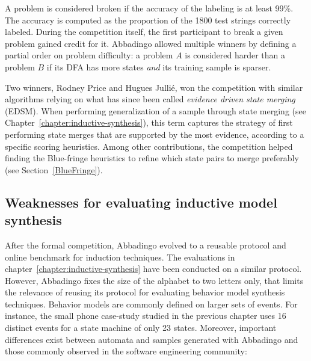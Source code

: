 A problem is considered broken if the accuracy of the labeling is at least 99\%. The accuracy is computed as the proportion of the 1800 test strings correctly labeled. During the competition itself, the first participant to break a given problem gained credit for it. Abbadingo allowed multiple winners by defining a partial order on problem difficulty: a problem $A$ is considered harder than a problem $B$ if its DFA has more states \emph{and} its training sample is sparser. 

Two winners, Rodney Price and Hugues Julli\'e, won the competition with similar algorithms relying on what has since been called \emph{evidence driven state merging} (EDSM). When performing generalization of a sample through state merging (see Chapter~\ref{chapter:inductive-synthesis}), this term captures the strategy of first performing state merges that are supported by the most evidence, according to a specific scoring heuristics. Among other contributions, the competition helped finding the Blue-fringe heuristics to refine which state pairs to merge preferably (see Section~\ref{BlueFringe}).

\subsection{Weaknesses for evaluating inductive model synthesis}

After the formal competition, Abbadingo evolved to a reusable protocol and online benchmark for induction techniques. The evaluations in chapter~\ref{chapter:inductive-synthesis} have been conducted on a similar protocol. However, Abbadingo fixes the size of the alphabet to two letters only, that limits the relevance of reusing its protocol for evaluating behavior model synthesis techniques. Behavior models are commonly defined on larger sets of events. For instance, the small phone case-study studied in the previous chapter uses 16 distinct events for a state machine of only 23 states. Moreover, important differences exist between automata and samples generated with Abbadingo and those commonly observed in the software engineering community:

